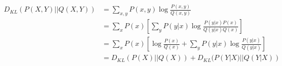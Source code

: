 %
%
\begin{answer}
\begin{align*}
D_{KL}(P(X,Y) || Q(X,Y))
&= \sum_{x,y} P(x,y) \log \frac{P(x,y)}{Q(x,y)}\\
&= \sum_x P(x) \left[ \sum_y P(y|x) \log \frac{P(y|x) P(x)}{Q(y|x) Q(x)} \right ]\\
&= \sum_x P(x) \left[ \log \frac{P(x)}{Q(x)} + \sum_y P(y|x) \log \frac{P(y|x)}{Q(y|x)} \right]\\
&= D_{KL}(P(X) || Q(X)) + D_{KL}(P(Y|X) || Q(Y|X))
\end{align*}
\end{answer}
%
